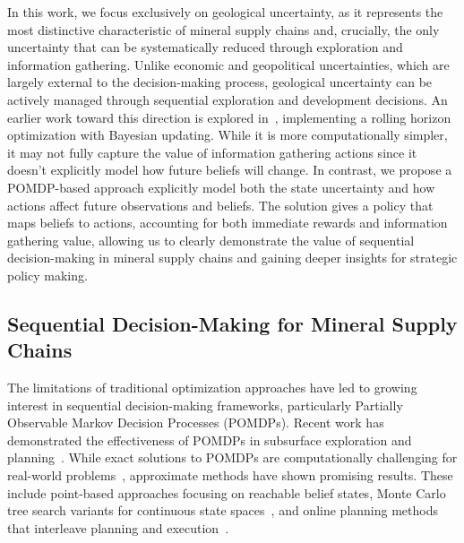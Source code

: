 In this work, we focus exclusively on geological uncertainty, as it represents the most distinctive characteristic of mineral supply chains and, crucially, the only uncertainty that can be systematically reduced through exploration and information gathering. Unlike economic and geopolitical uncertainties, which are largely external to the decision-making process, geological uncertainty can be actively managed through sequential exploration and development decisions. An earlier work toward this direction is explored in~\citep{armstrong2021adaptive}, implementing a rolling horizon optimization with Bayesian updating. While it is more computationally simpler, it may not fully capture the value of information gathering actions since it doesn't explicitly model how future beliefs will change. In contrast, we propose a POMDP-based approach explicitly model both the state uncertainty and how actions affect future observations and beliefs. The solution gives a policy that maps beliefs to actions, accounting for both immediate rewards and information gathering value, allowing us to clearly demonstrate the value of sequential decision-making in mineral supply chains and gaining deeper insights for strategic policy making.


\subsection{Sequential Decision-Making for Mineral Supply Chains}

The limitations of traditional optimization approaches have led to growing interest in sequential decision-making frameworks, particularly Partially Observable Markov Decision Processes (POMDPs). Recent work has demonstrated the effectiveness of POMDPs in subsurface exploration and planning~\citep{mern2023intelligent, corso2024sequentially}. While exact solutions to POMDPs are computationally challenging for real-world problems~\citep{shani2013survey}, approximate methods have shown promising results. These include point-based approaches focusing on reachable belief states, Monte Carlo tree search variants for continuous state spaces~\citep{gelly2011monte}, and online planning methods that interleave planning and execution~\citep{silver2010monte}. %


